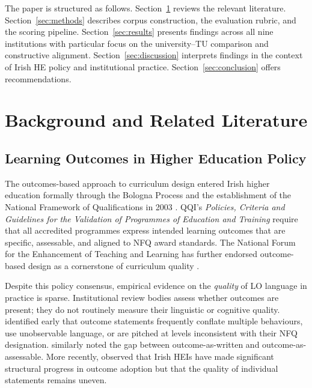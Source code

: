 \documentclass[12pt, a4paper]{article}
\begin{document}
The paper is structured as follows. Section~\ref{sec:background} reviews the relevant
literature. Section~\ref{sec:methods} describes corpus construction, the evaluation
rubric, and the scoring pipeline. Section~\ref{sec:results} presents findings across
all nine institutions with particular focus on the university--TU comparison and
constructive alignment. Section~\ref{sec:discussion} interprets findings in the context
of Irish HE policy and institutional practice. Section~\ref{sec:conclusion} offers
recommendations.

\section{Background and Related Literature}
\label{sec:background}

\subsection{Learning Outcomes in Higher Education Policy}

The outcomes-based approach to curriculum design entered Irish higher education
formally through the Bologna Process and the establishment of the National Framework
of Qualifications in 2003 \citep{nfq2003}. QQI's \textit{Policies, Criteria and
Guidelines for the Validation of Programmes of Education and Training}
\citep{qqi2021policies} require that all accredited programmes express intended
learning outcomes that are specific, assessable, and aligned to NFQ award standards.
The National Forum for the Enhancement of Teaching and Learning has further endorsed
outcome-based design as a cornerstone of curriculum quality
\citep{nationalforum2016mapping}.

Despite this policy consensus, empirical evidence on the \emph{quality} of LO
language in practice is sparse. Institutional review bodies assess whether outcomes
are present; they do not routinely measure their linguistic or cognitive quality.
\citet{hussey2002trouble} identified early that outcome statements frequently conflate
multiple behaviours, use unobservable language, or are pitched at levels inconsistent
with their NFQ designation. \citet{moon2002module} similarly noted the gap between
outcome-as-written and outcome-as-assessable. More recently, \citet{donnelly2019outcomes}
observed that Irish HEIs have made significant structural progress in outcome adoption
but that the quality of individual statements remains uneven.
\end{document}
